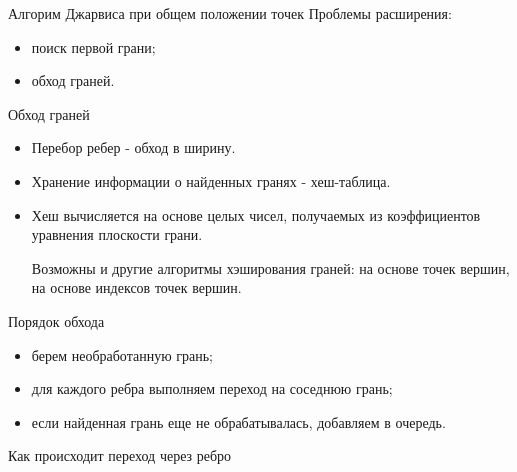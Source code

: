 \documentclass[]{beamer} %
\begin{document}
\begin{frame}{Алгорим Джарвиса при общем положении точек}
    Проблемы расширения:
       \begin{itemize}
        \item  поиск первой грани;
        \item  обход граней.
        \end{itemize}
\end{frame}
\begin{frame}{Обход граней}
    \begin{itemize}
        \item Перебор ребер - обход в ширину.
        \item Хранение информации о найденных гранях - хеш-таблица.
        \item Хеш вычисляется на основе целых чисел, получаемых из коэффициентов уравнения плоскости грани.

        Возможны и другие алгоритмы хэширования граней: на основе точек вершин, на основе индексов точек вершин.
    \end{itemize}
    \vfill
    \pause
    Порядок обхода
    \begin{itemize}
        \item берем необработанную грань;
        \item для каждого ребра выполняем переход на соседнюю грань;
        \item если найденная грань еще не обрабатывалась, добавляем в очередь.
    \end{itemize}
\end{frame}

\begin{frame}[t]{Как происходит переход через ребро }
    \vspace*{-8mm}\hspace*{15mm}%
    \only<1>{}%
    \only<2>{}%
    \only<3>{}%
    \only<6>{}%

\end{frame}
\end{document}

